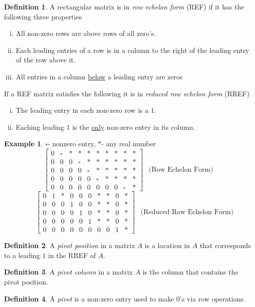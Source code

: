 \documentclass[12pt,letterpaper]{article}
\newcommand{\0}{{\bf 0}}
\theoremstyle{plain}
\theoremstyle{definition}
\newtheorem{definition}{Definition}
\newtheorem{example}{Example}
\begin{document}
\begin{definition}
A rectangular matrix is in \emph{row echelon form }(REF) if it has the following three properties
\begin{enumerate}[(i)]
\item All non-zero rows are above rows of all zero's.
\item  Each leading entries of a row is in a column to the right of the leading entry of the row above it. 
\item All entries in a column \underline{below} a leading entry are zeros
\end{enumerate}
If a REF matrix satisfies the following it is in \emph{reduced row echelon form} (RREF)
\begin{enumerate}[(i)]
\item The leading entry in each non-zero row is a $1$.
\item Eaching leading $1$ is the \underline{only} non-zero entry in its column.
\end{enumerate}
\end{definition}
\begin{example} 
$\square$- nonzero entry, $\ast$- any real number
\[\begin{bmatrix}
0 & \square & \ast & \ast & \ast & \ast & \ast & \ast & \ast & \ast \\
0 & 0& 0 & \square & \ast & \ast & \ast & \ast & \ast & \ast \\
0& 0& 0& 0& \square & \ast & \ast & \ast & \ast & \ast \\
0 & 0 & 0 & 0& 0& \square & \ast & \ast & \ast & \ast \\
0 &0 &0 &0 &0 &0 &0 &0 &\square & \ast 
\end{bmatrix}\ \ \text{ (Row Echelon Form) }\] 
\[\ \ \ \ \ \ \ \ \begin{bmatrix}
0 & 1 & \ast & 0 & 0 & 0 & \ast & \ast & 0 & \ast \\
0 & 0& 0 & 1 & 0 & 0 & \ast & \ast & 0 & \ast \\
0& 0& 0& 0& 1 & 0 & \ast & \ast & 0 & \ast \\
0 & 0 & 0 & 0& 0& 1 & \ast & \ast & 0 & \ast \\
0 &0 &0 &0 &0 &0 &0 &0 &1 & \ast 
\end{bmatrix}\ \ \text{ (Reduced Row Echelon Form) }\]
\end{example}
\begin{definition}
A \emph{pivot position} in a matrix $A$ is a location in $A$ that corresponds to a leading $1$ in the RREF of $A$. 
\end{definition}
\begin{definition}
A \emph{pivot column} in a matrix $A$ is the column that contains the pivot position.
\end{definition}
\begin{definition}
A \emph{pivot} is a non-zero entry used to make 0's via row operations. 
\end{definition}
\end{document}
